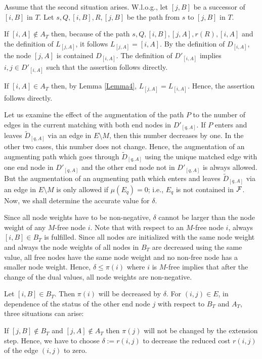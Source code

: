 \documentclass[12pt,twoside,a4paper]{article}
\def\QED{\hbox{\hskip 1pt \vrule width4pt height 6pt depth 1.5pt \hskip 1pt}}
\begin{document}
Assume that the second situation arises. W.l.o.g., let $[j,B]$ be a successor of $[i,B]$ 
in $T$. Let $s,Q,[i,B],R,[j,B]$ be the path from $s$ to $[j,B]$ in $T$. 

If $[i,A] \not\in A_T$ then, because of the path $s,Q,[i,B],[j,A],r(R),[i,A]$ and
the definition of $L_{[j,A]}$, it follows $L_{[j,A]} = [i,A]$. By the definition
of $D_{[i,A]}$, the node $[j,A]$ is contained $D_{[i,A]}$. The definition of $D'_{[i,A]}$ implies 
$i,j \in D'_{[i,A]}$ such that the assertion follows directly.

If $[i,A] \in A_T$ then, by Lemma \ref{Lemma4}, $L_{[j,A]} = L_{[i,A]}$. Hence, the assertion 
follows directly.
\QED

\medskip
Let us examine the effect of the augmentation of the path $P$ to the number of edges
in the current matching with both end nodes in $D'_{[q,A]}$.
If $P$ enters and leaves $\tilde{D}_{[q,A]}$ via an edge in $E \setminus M$, then this number  
decreases by one. In the other two cases, this number does not change.
Hence, the augmentation of an augmenting path which goes through $\tilde{D}_{[q,A]}$
using the unique matched edge with one end node in $D'_{[q,A]}$ and the other end node 
not in $D'_{[q,A]}$ is always allowed. But the augmentation of an augmenting path which
enters and leaves $\tilde{D}_{[q,A]}$ via an edge in $E \setminus M$
is only allowed if $\mu(E_q) = 0$; i.e., $E_q$ is not contained in $\cal{F}$.
Now, we shall determine the accurate value for $\delta$.

Since all node weights have to be non-negative, $\delta$ cannot be larger 
than the node weight of any $M$-free node $i$. Note that with respect to an $M$-free
node $i$, always $[i,B] \in B_T$ is fulfilled. Since all nodes are initialized with the same 
node weight and always the node weights of all nodes in $B_T$ are decreased using the same 
value, all free nodes have the same node weight and no non-free node has a smaller node weight.
Hence, $\delta \leq \pi(i)$ where $i$ is $M$-free implies that after the 
change of the dual values, all node weights are non-negative.

Let $[i,B] \in B_T$. Then $\pi(i)$ will be decreased by $\delta$. For $(i,j) \in E$, 
in dependence of the status of the other end node $j$ with respect to $B_T$ and $A_T$, 
three situations can arise:

If $[j,B] \not\in B_T$ and $[j,A] \not\in A_T$ then $\pi(j)$ will not be changed by the
extension step. Hence, we have to choose $\delta := r(i,j)$ 
to decrease the reduced cost $r(i,j)$ of the edge $(i,j)$ to zero.
 
\end{document}
